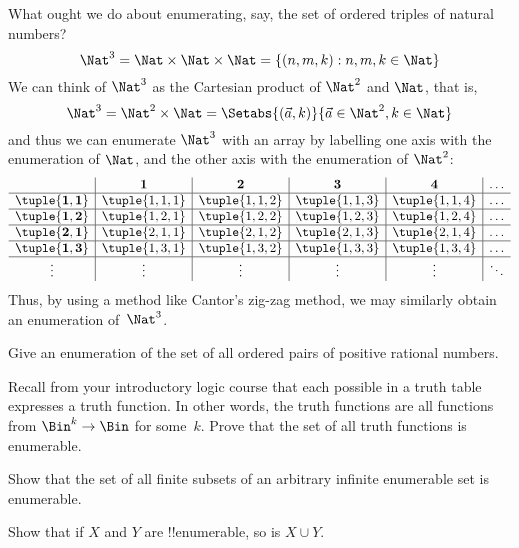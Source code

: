 \documentclass[../../include/open-logic-section]{subfiles}
\begin{document}
\begin{explain}
What ought we do about enumerating, say, the set of ordered triples 
of natural numbers?
\[ 
\Nat^3 = \Nat \times \Nat \times \Nat = \{ (n,m,k) : n,m,k \in \Nat \} 
\]
We can think of $\Nat^3$ as the Cartesian product of
$\Nat^2$ and $\Nat$, that is, 
\[ 
\Nat^3 = \Nat^2 \times \Nat = \Setabs{(\vec a, 
k)}{\vec a \in \Nat^2, k \in \Nat } 
\]
and thus we can enumerate $\Nat^3$ with an array by 
labelling one axis with the enumeration of $\Nat$, and the 
other axis with the enumeration of $\Nat^2$:
\[
\begin{array}{ c | c | c | c | c | c}
& \textbf 1 & \textbf 2 & \textbf 3 & \textbf 4 & \dots \\
\hline
\mathbf{\tuple{1,1}} & \tuple{1,1,1} & \tuple{1,1,2} & \tuple{1,1,3} & \tuple{1,1,4} & \dots \\
\hline
\mathbf{\tuple{1,2}} & \tuple{1,2,1} & \tuple{1,2,2} & \tuple{1,2,3} & \tuple{1,2,4} & \dots \\
\hline
\mathbf{\tuple{2,1}} & \tuple{2,1,1} & \tuple{2,1,2} & \tuple{2,1,3} & \tuple{2,1,4} & \dots \\
\hline
\mathbf{\tuple{1,3}} & \tuple{1,3,1} & \tuple{1,3,2} & \tuple{1,3,3} & \tuple{1,3,4} & \dots\\
\hline
\vdots & \vdots & \vdots & \vdots & \vdots & \ddots \\
\end{array}
\]
Thus, by using a method like Cantor's zig-zag method, we may 
similarly obtain an enumeration of~$\Nat^3$. 
\end{explain}

\begin{prob}
Give an enumeration of the set of all ordered pairs of positive
rational numbers.
\end{prob}

\begin{prob}
Recall from your introductory logic course that each possible in a
truth table expresses a truth function. In other words, the truth
functions are all functions from $\Bin^k \to \Bin$ for some~$k$. Prove
that the set of all truth functions is enumerable.
\end{prob}

\begin{prob}
Show that the set of all finite subsets of an arbitrary infinite
enumerable set is enumerable.
\end{prob}

\begin{prob}
Show that if $X$ and $Y$ are !!{enumerable}, so is $X \cup Y$.
\end{prob}
\end{document}
